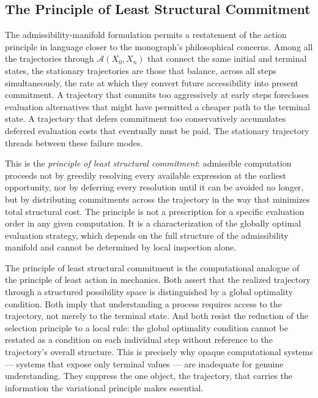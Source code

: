\documentclass[12pt,openany]{book}
\theoremstyle{plain}
\theoremstyle{definition}
\theoremstyle{remark}
\begin{document}
\subsection{The Principle of Least Structural Commitment}

The admissibility-manifold formulation permits a restatement of the action principle in language closer to the monograph's philosophical concerns. Among all the trajectories through $\mathcal{A}(X_0, X_n)$ that connect the same initial and terminal states, the stationary trajectories are those that balance, across all steps simultaneously, the rate at which they convert future accessibility into present commitment. A trajectory that commits too aggressively at early steps forecloses evaluation alternatives that might have permitted a cheaper path to the terminal state. A trajectory that defers commitment too conservatively accumulates deferred evaluation costs that eventually must be paid. The stationary trajectory threads between these failure modes.

This is the \emph{principle of least structural commitment}: admissible computation proceeds not by greedily resolving every available expression at the earliest opportunity, nor by deferring every resolution until it can be avoided no longer, but by distributing commitments across the trajectory in the way that minimizes total structural cost. The principle is not a prescription for a specific evaluation order in any given computation. It is a characterization of the globally optimal evaluation strategy, which depends on the full structure of the admissibility manifold and cannot be determined by local inspection alone.

The principle of least structural commitment is the computational analogue of the principle of least action in mechanics. Both assert that the realized trajectory through a structured possibility space is distinguished by a global optimality condition. Both imply that understanding a process requires access to the trajectory, not merely to the terminal state. And both resist the reduction of the selection principle to a local rule: the global optimality condition cannot be restated as a condition on each individual step without reference to the trajectory's overall structure. This is precisely why opaque computational systems — systems that expose only terminal values — are inadequate for genuine understanding. They suppress the one object, the trajectory, that carries the information the variational principle makes essential.
\end{document}
